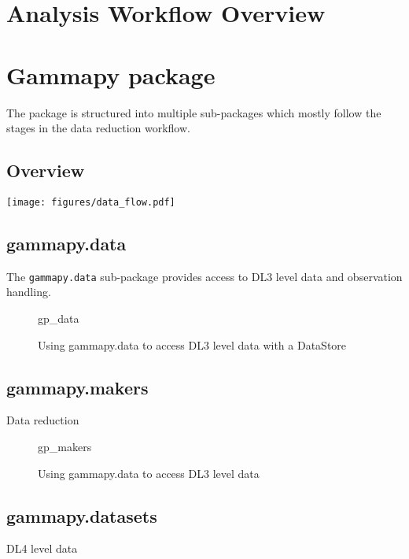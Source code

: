 \section{Analysis Workflow Overview}
\label{sec:analysis-workflow-overview}

\section{Gammapy package}
\label{sec:gammapy-package}

The \gammapy package is structured into multiple sub-packages which mostly
follow the stages in the data reduction workflow.

\subsection{Overview}
\label{ssec:overview}
\begin{figure*}[t]
	\centering
	\texttt{[image: figures/data\_flow.pdf]}
	\caption{
		Gammapy sub-package structure and data analysis workflow. }
	\label{fig:data_flow}
\end{figure*}

\subsection{gammapy.data}
\label{ssec:gammapy-data}
The \verb|gammapy.data| sub-package provides access to DL3 level data and
observation handling.

\begin{figure}

	{gp_data}

	\caption{Using gammapy.data to access DL3 level data with a DataStore}
	\label{fig*:minted:gp_data}
\end{figure}

\subsection{gammapy.makers}
\label{ssec:gammapy-makers}
Data reduction

\begin{figure}
	{gp_makers}

	\caption{Using gammapy.data to access DL3 level data}
	\label{ig*:minted:gp_makers}
\end{figure}

\subsection{gammapy.datasets}
\label{ssec:gammapy-datasets}
DL4 level data

